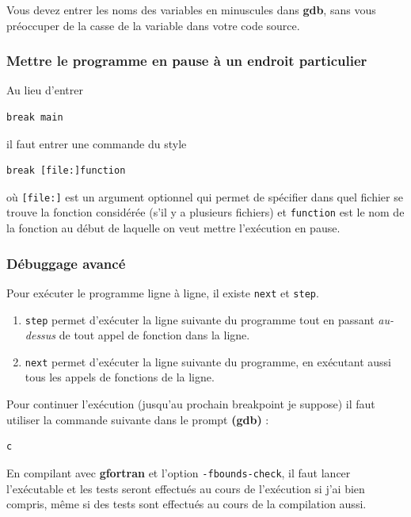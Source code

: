 \documentclass[a4paper,twoside]{article}
\begin{document}
\begin{attention}
Vous devez entrer les noms des variables en minuscules dans \textbf{gdb}, sans vous préoccuper de la casse de la variable dans votre code source.
\end{attention}

\subsubsection{Mettre le programme en pause à un endroit particulier}
Au lieu d'entrer 
\begin{verbatim}
break main
\end{verbatim}
il faut entrer une commande du style
\begin{verbatim}
break [file:]function
\end{verbatim}
où \texttt{[file:]} est un argument optionnel qui permet de spécifier dans quel fichier se trouve la fonction considérée (s'il y a plusieurs fichiers) et \texttt{function} est le nom de la fonction au début de laquelle on veut mettre l'exécution en pause.

\subsubsection{Débuggage avancé}
Pour exécuter le programme ligne à ligne, il existe \texttt{next} et \texttt{step}. 
\begin{enumerate}
\item \texttt{step} permet d'exécuter la ligne suivante du programme tout en passant \emph{au-dessus} de tout appel de fonction dans la ligne.
\item \texttt{next} permet d'exécuter la ligne suivante du programme, en exécutant aussi tous les appels de fonctions de la ligne.
\end{enumerate}


\bigskip

Pour continuer l'exécution (jusqu'au prochain breakpoint je suppose) il faut utiliser la commande suivante dans le prompt \textbf{(gdb)} :
\begin{verbatim}
c
\end{verbatim}

\begin{remarque}
En compilant avec \textbf{gfortran} et l'option \texttt{-fbounds-check}, il faut lancer l'exécutable et les tests seront effectués au cours de l'exécution si j'ai bien compris, même si des tests sont effectués au cours de la compilation aussi.
\end{remarque}
\end{document}
